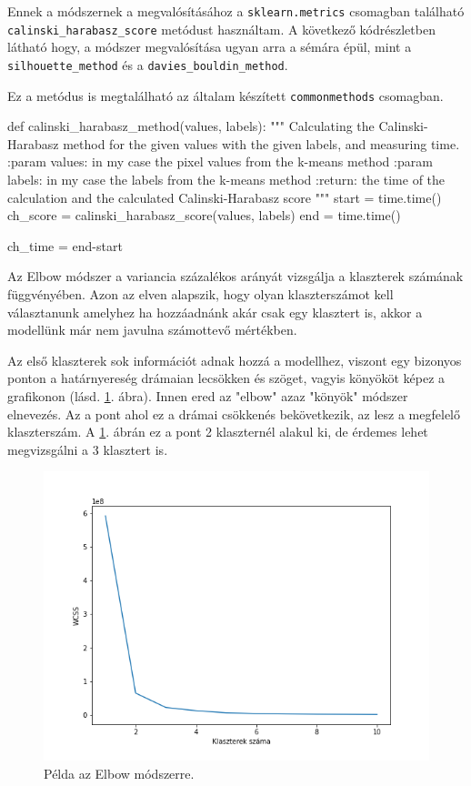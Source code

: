 Ennek a módszernek a megvalósításához a \texttt{sklearn.metrics} csomagban található \texttt{calinski\_harabasz\_score} metódust használtam. A következő kódrészletben látható hogy, a módszer megvalósítása ugyan arra a sémára épül, mint a \texttt{silhouette\_method} és a \texttt{davies\_bouldin\_method}.

Ez a metódus is megtalálható az általam készített \texttt{commonmethods} csomagban.
\begin{python}
def calinski_harabasz_method(values, labels):
    """
    Calculating the Calinski-Harabasz method for the given values with
    the given labels, and measuring time.
    :param values: in my case the pixel values from the k-means method
    :param labels: in my case the labels from the k-means method
    :return: the time of the calculation and
        the calculated Calinski-Harabasz score
    """
    start = time.time()
    ch_score = calinski_harabasz_score(values, labels)
    end = time.time()

    ch_time = end-start
\end{python}


Az Elbow módszer a variancia százalékos arányát vizsgálja a klaszterek számának függvényében. Azon az elven alapszik, hogy olyan klaszterszámot kell választanunk amelyhez ha hozzáadnánk akár csak egy klasztert is, akkor a modellünk már nem javulna számottevő mértékben.

Az első klaszterek sok információt adnak hozzá a modellhez, viszont egy bizonyos ponton a határnyereség drámaian lecsökken és szöget, vagyis könyököt képez a grafikonon (lásd. \ref{fig:elbow_example}. ábra). Innen ered az "elbow" azaz "könyök" módszer elnevezés. Az a pont ahol ez a drámai csökkenés bekövetkezik, az lesz a megfelelő klaszterszám. A \ref{fig:elbow_example}. ábrán ez a pont 2 klaszternél alakul ki, de érdemes lehet megvizsgálni a 3 klasztert is. \cite{elbow}

\begin{figure}[h]
\centering
\includegraphics[scale=0.7]{images/elbow_example.png}
\caption{Példa az Elbow módszerre.}
\label{fig:elbow_example}
\end{figure}

